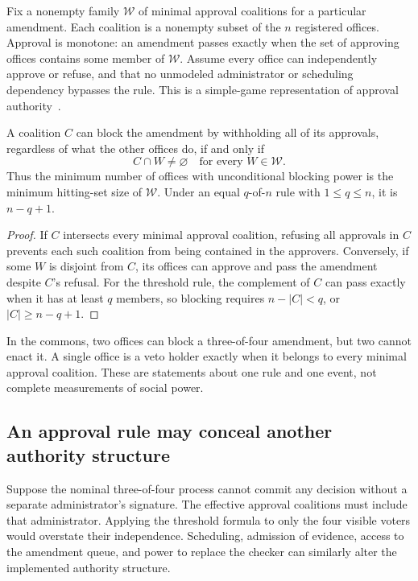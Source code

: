 Fix a nonempty family $\mathcal W$ of minimal approval coalitions for a particular amendment. Each coalition is a nonempty subset of the $n$ registered offices. Approval is monotone: an amendment passes exactly when the set of approving offices contains some member of $\mathcal W$. Assume every office can independently approve or refuse, and that no unmodeled administrator or scheduling dependency bypasses the rule. This is a simple-game representation of approval authority~\cite{MS:taylorzwicker}.

\begin{MSproposition}\label{MS:prop:blocker}
A coalition $C$ can block the amendment by withholding all of its approvals, regardless of what the other offices do, if and only if
\[
C\cap W\ne\varnothing\quad\text{for every }W\in\mathcal W.
\]
Thus the minimum number of offices with unconditional blocking power is the minimum hitting-set size of $\mathcal W$. Under an equal $q$-of-$n$ rule with $1\leq q\leq n$, it is $n-q+1$.
\end{MSproposition}
\begin{proof}
If $C$ intersects every minimal approval coalition, refusing all approvals in $C$ prevents each such coalition from being contained in the approvers. Conversely, if some $W$ is disjoint from $C$, its offices can approve and pass the amendment despite $C$'s refusal. For the threshold rule, the complement of $C$ can pass exactly when it has at least $q$ members, so blocking requires $n-|C|<q$, or $|C|\geq n-q+1$.
\end{proof}

In the commons, two offices can block a three-of-four amendment, but two cannot enact it. A single office is a veto holder exactly when it belongs to every minimal approval coalition. These are statements about one rule and one event, not complete measurements of social power.

\subsection{An approval rule may conceal another authority structure}
Suppose the nominal three-of-four process cannot commit any decision without a separate administrator's signature. The effective approval coalitions must include that administrator. Applying the threshold formula to only the four visible voters would overstate their independence. Scheduling, admission of evidence, access to the amendment queue, and power to replace the checker can similarly alter the implemented authority structure.


